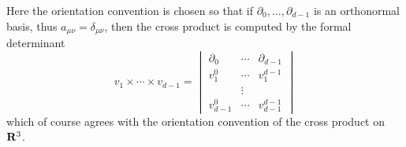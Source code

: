 Here the orientation convention is chosen so that if $\partial_0, \dots, \partial_{d - 1}$ is an orthonormal basis, thus $a_{\mu\nu} = \delta_{\mu\nu}$, then the cross product is computed by the formal determinant
\begin{equation}\label{formal determinant}
v_1 \times \cdots \times v_{d - 1} = \begin{vmatrix}\partial_0 & \cdots & \partial_{d - 1} \\
v_1^0 & \cdots & v_1^{d - 1}\\
& \vdots \\
v_{d - 1}^0 & \cdots & v_{d - 1}^{d - 1}\end{vmatrix}
\end{equation}
which of course agrees with the orientation convention of the cross product on $\mathbf{R}^3$.

